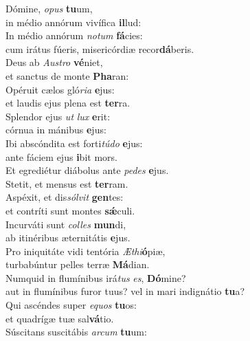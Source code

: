 \evenverse Dómine, \textit{o}\textit{pus} \textbf{tu}um,~\*\\
\evenverse in médio annórum vivífica \textbf{il}lud:\\
\oddverse In médio annórum \textit{no}\textit{tum} \textbf{fá}cies:~\*\\
\oddverse cum irátus fúeris, misericórdiæ recor\textbf{dá}beris.\\
\evenverse Deus ab \textit{Au}\textit{stro} \textbf{vé}niet,~\*\\
\evenverse et sanctus de monte \textbf{Pha}ran:\\
\oddverse Opéruit cælos gló\textit{ri}\textit{a} \textbf{e}jus:~\*\\
\oddverse et laudis ejus plena est \textbf{ter}ra.\\
\evenverse Splendor ejus \textit{ut} \textit{lux} \textbf{e}rit:~\*\\
\evenverse córnua in mánibus \textbf{e}jus:\\
\oddverse Ibi abscóndita est forti\textit{tú}\textit{do} \textbf{e}jus:~\*\\
\oddverse ante fáciem ejus \textbf{i}bit mors.\\
\evenverse Et egrediétur diábolus ante \textit{pe}\textit{des} \textbf{e}jus.~\*\\
\evenverse Stetit, et mensus est \textbf{ter}ram.\\
\oddverse Aspéxit, et dis\textit{sól}\textit{vit} \textbf{gen}tes:~\*\\
\oddverse et contríti sunt montes \textbf{sǽ}culi.\\
\evenverse Incurváti sunt \textit{col}\textit{les} \textbf{mun}di,~\*\\
\evenverse ab itinéribus æternitátis \textbf{e}jus.\\
\oddverse Pro iniquitáte vidi tentória \textit{Æ}\textit{thi}\textbf{ó}piæ,~\*\\
\oddverse turbabúntur pelles terræ \textbf{Má}dian.\\
\evenverse Numquid in flumínibus irá\textit{tus} \textit{es}, \textbf{Dó}mine?~\*\\
\evenverse aut in flumínibus furor tuus? vel in mari indignátio \textbf{tu}a?\\
\oddverse Qui ascéndes super \textit{e}\textit{quos} \textbf{tu}os:~\*\\
\oddverse et quadrígæ tuæ sal\textbf{vá}tio.\\
\evenverse Súscitans suscitábis \textit{ar}\textit{cum} \textbf{tu}um:~\*\\
